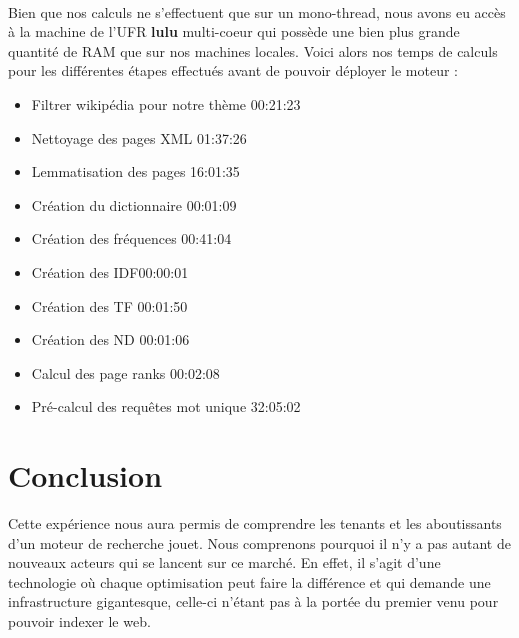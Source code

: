\documentclass[10pt,a4paper]{article}
\begin{document}
\paragraph{}Bien que nos calculs ne s'effectuent que sur un mono-thread, nous avons eu accès à la machine de l'UFR \textbf{lulu} multi-coeur qui possède une bien plus grande quantité de RAM que sur nos machines locales. Voici alors nos temps de calculs pour les différentes étapes effectués avant de pouvoir déployer le moteur :
\begin{itemize}
	\item{Filtrer wikipédia pour notre thème} 00:21:23
	\item{Nettoyage des pages XML} 01:37:26
	\item{Lemmatisation des pages} 16:01:35
	\item{Création du dictionnaire} 00:01:09
	\item{Création des fréquences} 00:41:04
	\item{Création des IDF}00:00:01
	\item{Création des TF} 00:01:50
	\item{Création des ND} 00:01:06
	\item{Calcul des page ranks} 00:02:08
	\item{Pré-calcul des requêtes mot unique} 32:05:02
\end{itemize}


\section{Conclusion}
Cette expérience nous aura permis de comprendre les tenants et les aboutissants d'un moteur de recherche jouet. Nous comprenons pourquoi il n'y a pas autant de nouveaux acteurs qui se lancent sur ce marché. En effet, il s'agit d'une technologie où chaque optimisation peut faire la différence et qui demande une infrastructure gigantesque, celle-ci n'étant pas à la portée du premier venu pour pouvoir indexer le web.
\end{document}
